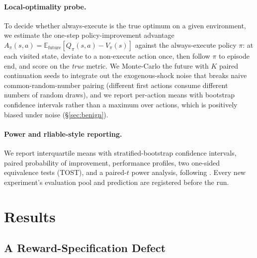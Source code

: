 \documentclass[10pt,twocolumn]{article}
\begin{document}
\paragraph{Local-optimality probe.} To decide whether always-execute is the true
optimum on a given environment, we estimate the one-step policy-improvement
advantage $A_\pi(s,a)=\mathbb{E}_{\text{future}}[Q_\pi(s,a)-V_\pi(s)]$ against the
always-execute policy $\pi$: at each visited state, deviate to a non-execute
action once, then follow $\pi$ to episode end, and score on the \emph{true}
metric. We Monte-Carlo the future with $K$ paired continuation seeds to integrate
out the exogenous-shock noise that breaks naive common-random-number pairing
(different first actions consume different numbers of random draws), and we report
per-action means with bootstrap confidence intervals rather than a maximum over
actions, which is positively biased under noise (\S\ref{sec:benign}).

\paragraph{Power and rliable-style reporting.} We report interquartile means with
stratified-bootstrap confidence intervals, paired probability of improvement,
performance profiles, two one-sided equivalence tests (TOST), and a paired-$t$
power analysis, following \cite{agarwal2021precipice}. Every new experiment's
evaluation pool and prediction are registered before the run.

\section{Results}
\label{sec:results}

\subsection{A Reward-Specification Defect}
\label{sec:reward-bug}
\end{document}
